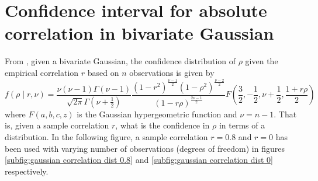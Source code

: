 \documentclass[../Thesis.tex]{subfiles}
\begin{document}
\section{Confidence interval for absolute correlation in bivariate Gaussian}\label{sec:bivar gauss abs correlation CI}
From \cite{Confidence-in-Correlation}, given a bivariate Gaussian, the confidence distribution of $\rho$ given the empirical correlation $r$ based on $n$ observations is given by
$$f\left(\rho \mid r,\nu\right) = \frac{\nu (\nu-1) \Gamma(\nu-1)}{\sqrt{2\pi} \Gamma(\nu + \frac{1}{2})} \frac{\left(1-r^2\right)^{\frac{\nu-1}{2}} \left(1-\rho^2\right)^{\frac{\nu-2}{2}} }{\left(1-r\rho\right)^{\frac{2\nu-1}{2}}} F\left(\frac{3}{2}, -\frac{1}{2}, \nu+\frac{1}{2}, \frac{1+r\rho}{2}\right)$$
where $F\left(a,b,c,z\right)$ is the Gaussian hypergeometric function and $\nu = n-1$. That is, given a sample correlation $r$, what is the confidence in $\rho$ in terms of a distribution. In the following figure, a sample correlation $r=0.8$ and $r=0$ has been used with varying number of observations (degrees of freedom) in figures \autoref{subfig:gaussian correlation dist 0.8} and \autoref{subfig:gaussian correlation dist 0} respectively.
\end{document}
